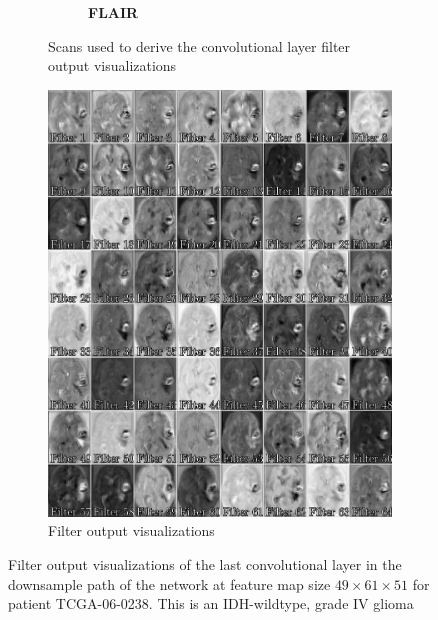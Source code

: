 \begin{subappendices}
\begin{figure}
\begin{subfigure}[b]{0.77\textwidth}
\begin{subfigure}[b]{0.24\textwidth}
        \caption*{\normalfont \textbf{\acrshort{FLAIR}}\nopunct}
        \end{subfigure}
        \caption{Scans used to derive the convolutional layer filter output visualizations}
    \end{subfigure}
    \begin{subfigure}[b]{0.77\textwidth}
        \centering
        \includegraphics[width=\textwidth]{Figures/conv_filter_HGG_shallow.pdf}
        \caption{Filter output visualizations}\label{fig:prognosais_filter_hgg_shallow_filter_only}
    \end{subfigure}
    \caption{Filter output visualizations of the last convolutional layer in the downsample path of the network at feature map size $49\times61\times51$ for patient TCGA-06-0238.
    This is an \acrshort{IDH}-wildtype, grade IV glioma}\label{fig:filter_hgg_shallow}
\end{figure}


\end{subappendices}
